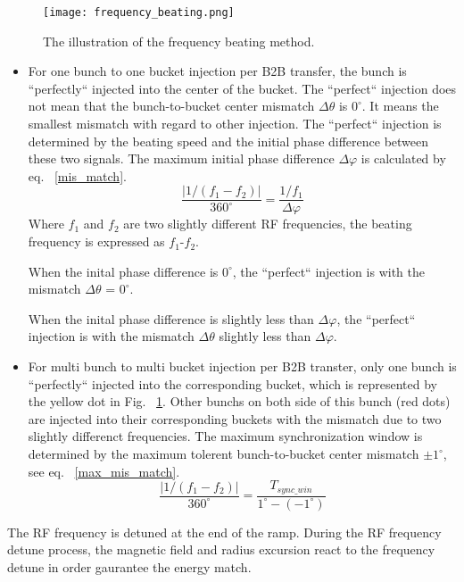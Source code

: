 \begin{figure}[!htb]
   \centering   
   \texttt{[image: frequency\_beating.png]}
   \caption{The illustration of the frequency beating method.}
   \label{frequency_beat}
\end{figure}
\begin{itemize}
\item
For one bunch to one bucket injection per B2B transfer, the bunch is ``perfectly`` injected into the center of the bucket. The ``perfect`` injection does not mean that the bunch-to-bucket center mismatch $\Delta \theta$ is $0^\circ$. It means the smallest mismatch with regard to other injection. The ``perfect`` injection is determined by the beating speed and the initial phase difference between these two signals. The maximum initial phase difference $\Delta \varphi$ is calculated by eq. ~\ref{mis_match}.
\begin{equation}
\frac{|1/(f_1-f_2)|}{360^\circ} = \frac{1/f_1}{\Delta \varphi}\label{mis_match}
\end{equation}
Where $f_1$ and $f_2$ are two slightly different RF frequencies, the beating frequency is expressed as $f_1$-$f_2$.

When the inital phase difference is $0^\circ$, the ``perfect`` injection is with the mismatch $\Delta \theta$ = $0^\circ$.

When the inital phase difference is slightly less than $\Delta \varphi$, the ``perfect`` injection is with the mismatch $\Delta \theta$ slightly less than $\Delta \varphi$.

\item 
For multi bunch to multi bucket injection per B2B transter, only one bunch is ``perfectly`` injected into the corresponding bucket, which is represented by the yellow dot in Fig. ~\ref{frequency_beat}. Other bunchs on both side of this bunch (red dots) are injected into their corresponding buckets with the mismatch due to two slightly differenct frequencies. The maximum synchronization window is determined by the maximum tolerent bunch-to-bucket center mismatch $\pm 1^\circ$, see eq. ~\ref{max_mis_match}.
\begin{equation}
\frac{|1/(f_1-f_2)|}{360^\circ} = \frac{T_{sync\_win}}{1^\circ-(-1^\circ)}\label{max_mis_match}
\end{equation}

\end{itemize}

The RF frequency is detuned at the end of the ramp. During the RF frequency detune process, the magnetic field and radius excursion react to the frequency detune in order gaurantee the energy match.

